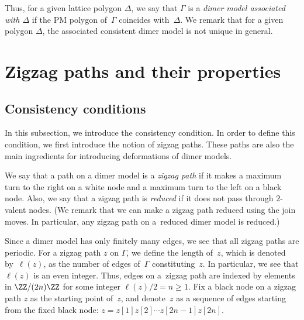 Thus, for a given lattice polygon $\Delta$, we say that $\Gamma$ is a \emph{dimer model associated with $\Delta$} if the PM polygon of~$\Gamma$ coincides with~$\Delta$.
We remark that for a given polygon $\Delta$, the associated consistent dimer model is not unique in general.

\section{Zigzag paths and their properties}\label{sec_zigzag}

\subsection{Consistency conditions}\label{subsec_consistency}

In this subsection, we introduce the consistency condition.
In order to define this condition, we first introduce the notion of zigzag paths.
These paths are also the main ingredients for introducing deformations of dimer models.

\begin{Definition}We say that a path on a dimer model is a \emph{zigzag path} if it makes a maximum turn to the right on a white node and a maximum turn to the left on a black node.
Also, we say that a zigzag path is \emph{reduced} if it does not pass through $2$-valent nodes.
(We remark that we can make a zigzag path reduced using the join moves. In particular, any zigzag path on a~reduced dimer model is reduced.)
\end{Definition}

Since a dimer model has only finitely many edges, we see that all zigzag paths are periodic.
For a zigzag path $z$ on $\Gamma$, we define the length of~$z$, which is denoted by~$\ell(z)$, as the number of edges of~$\Gamma$ constituting~$z$.
In particular, we see that $\ell(z)$ is an even integer.
Thus, edges on a~zigzag path are indexed by elements in $\ZZ/(2n)\ZZ$ for some integer $\ell(z)/2=n\ge 1$.
Fix a black node on a zigzag path $z$ as the starting point of~$z$, and denote~$z$ as a sequence of edges starting from the fixed black node:
$z=z[1]z[2]\cdots z[2n-1]z[2n]$.

